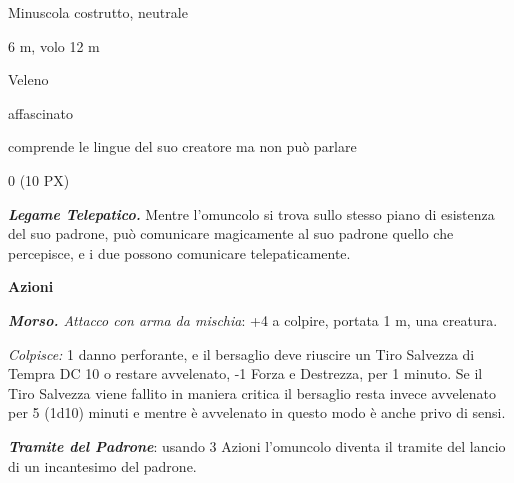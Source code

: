 \begin{multicols}{2}
{
\begin{description}[noitemsep, topsep=0pt, parsep=0pt, partopsep=0pt, itemsep=1pt, leftmargin=2.35cm,  labelwidth=2.2cm, itemindent=0cm, listparindent=0pt] %
\setlength{\baselineskip}{10pt}
\item[\textbf{Taglia/Tipo}] Minuscola costrutto, neutrale
\item[\textbf{Caratt.}] 
\item[\textbf{Punti Ferita}] 
\item[\textbf{Movimento}] 6 m, volo 12 m
\item[\textbf{Tiri Salvez.}] 
\item[\textbf{Imm. Danni}] Veleno
\item[\textbf{Immunità}] affascinato
\item[\textbf{Sensi}] 
\item[\textbf{Linguaggi}] comprende le lingue del suo creatore ma non può parlare
\item[\textbf{Sfida}] 0 (10 PX)
\end{description}
\smallskip

\emph{\textbf{Legame Telepatico.}} Mentre l'omuncolo si trova sullo stesso piano di esistenza del suo padrone, può comunicare magicamente al suo padrone quello che percepisce, e i due possono comunicare telepaticamente.

\textbf{Azioni}

\emph{\textbf{Morso.} Attacco con arma da mischia}: +4 a colpire, portata 1 m, una creatura.

\emph{Colpisce:} 1 danno perforante, e il bersaglio deve riuscire un Tiro Salvezza di Tempra DC 10 o restare avvelenato, -1 Forza e Destrezza, per 1 minuto. Se il Tiro Salvezza viene fallito in maniera critica il bersaglio resta invece avvelenato per 5 (1d10) minuti e mentre è avvelenato in questo modo è anche privo di sensi.

\emph{\textbf{Tramite del Padrone}}: usando 3 Azioni l'omuncolo diventa il tramite del lancio di un incantesimo del padrone.

}
\end{multicols}
